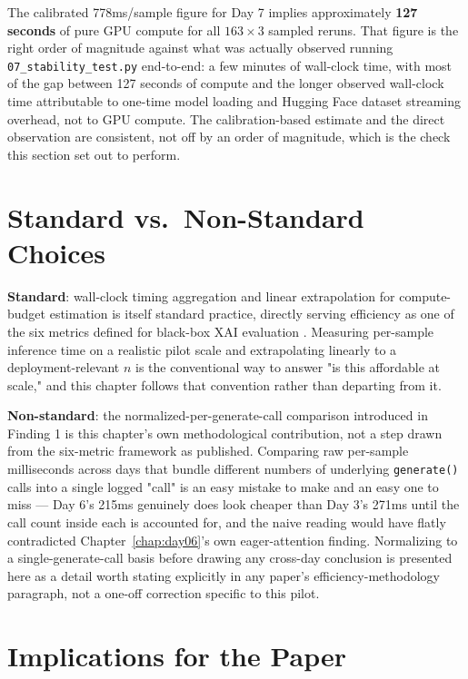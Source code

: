 The calibrated 778ms/sample figure for Day 7 implies approximately \textbf{127 seconds} of pure GPU
compute for all $163 \times 3$ sampled reruns. That figure is the right order of magnitude against
what was actually observed running \texttt{07\_stability\_test.py} end-to-end: a few minutes of
wall-clock time, with most of the gap between 127 seconds of compute and the longer observed
wall-clock time attributable to one-time model loading and Hugging Face dataset streaming overhead,
not to GPU compute. The calibration-based estimate and the direct observation are consistent, not
off by an order of magnitude, which is the check this section set out to perform.

\section{Standard vs.\ Non-Standard Choices}

\textbf{Standard}: wall-clock timing aggregation and linear extrapolation for compute-budget
estimation is itself standard practice, directly serving efficiency as one of the six metrics
defined for black-box XAI evaluation \citep{arreche2024exai}. Measuring per-sample inference time on
a realistic pilot scale and extrapolating linearly to a deployment-relevant $n$ is the conventional
way to answer "is this affordable at scale," and this chapter follows that convention rather than
departing from it.

\textbf{Non-standard}: the normalized-per-generate-call comparison introduced in Finding 1 is this
chapter's own methodological contribution, not a step drawn from the six-metric framework as
published. Comparing raw per-sample milliseconds across days that bundle different numbers of
underlying \texttt{generate()} calls into a single logged "call" is an easy mistake to make and an
easy one to miss --- Day 6's 215ms genuinely does look cheaper than Day 3's 271ms until the call
count inside each is accounted for, and the naive reading would have flatly contradicted
Chapter~\ref{chap:day06}'s own eager-attention finding. Normalizing to a single-generate-call basis
before drawing any cross-day conclusion is presented here as a detail worth stating explicitly in
any paper's efficiency-methodology paragraph, not a one-off correction specific to this pilot.

\section{Implications for the Paper}

